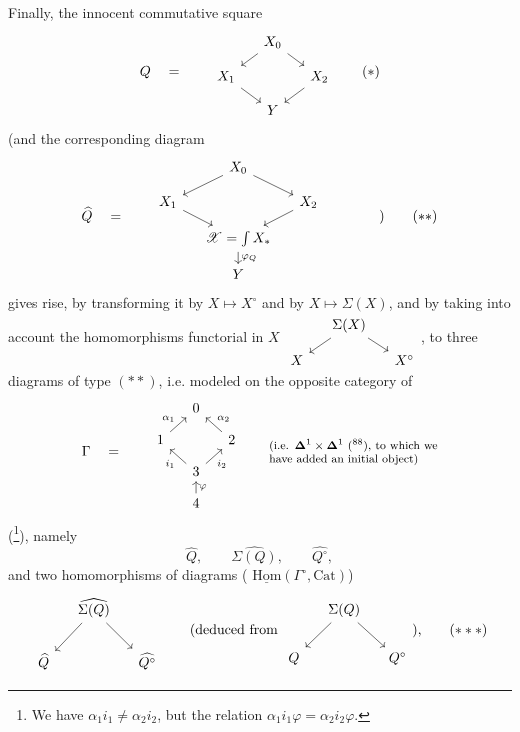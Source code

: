 \documentclass[11pt]{article}
\newcommand{\printedpage}[1]{\marginpar{\footnotesize p.~#1}}
\newcommand{\msp}[1]{\marginpar{\footnotesize [#1]}}
\newcommand{\Cat}{\mathrm{Cat}}
\newcommand{\Hom}{\mathrm{Hom}}
\newcommand{\sX}{\mathscr{X}}
\begin{document}
Finally, the innocent commutative square
\[
Q \quad = \qquad
\begin{tikzcd}[row sep=small, column sep=small]
 & X_0 \arrow[dl] \arrow[dr] & \\
X_1 \arrow[dr] & & X_2 \arrow[dl] \\
 & Y &
\end{tikzcd}
\tag*{$(*)$}
\]
(and the corresponding diagram
\[
\widehat{Q} \quad = \qquad
\begin{tikzcd}[row sep=small, column sep=small]
 & X_0 \arrow[dl] \arrow[dr] & \\
X_1 \arrow[dr] & & X_2 \arrow[dl] \\
 & \sX=\int X_* \arrow[d, "\varphi_Q"] & \\
 & Y &
\end{tikzcd}
\qquad\qquad )
\tag*{$(**)$}
\]
gives rise, by transforming it
\msp{page 139}
by $X\longmapsto X^\circ$ and by $X\longmapsto\Sigma(X)$, and by taking into account the homomorphisms functorial in $X$ $\begin{tikzcd}[row sep=small, column sep=small]
 & \Sigma(X) \arrow[dl] \arrow[dr] & \\
X & & X^\circ
\end{tikzcd}$, to three diagrams of type $(**)$, i.e. modeled on the opposite category of
\[
\Gamma \quad = \qquad
\begin{tikzcd}[row sep=small, column sep=small]
 & 0 & \\
1 \arrow[ur, "\alpha_1"] & & 2 \arrow[ul, "\alpha_2"'] \\
 & 3 \arrow[ul, "i_1"] \arrow[ur, "i_2"'] & \\
 & 4 \arrow[u, "\varphi"'] &
\end{tikzcd}
\qquad
\text{\parbox[c]{0.35\textwidth}{\footnotesize (i.e. $\boldsymbol{\Delta}^1\times\boldsymbol{\Delta}^1$ (\footnotemark[88]), to which we have added an initial object)}} %
\]
\printedpage{95}
(\footnote[89]{We have $\alpha_1i_1\neq\alpha_2i_2$, but the relation $\alpha_1i_1\varphi=\alpha_2i_2\varphi$.}), namely
\[
\widehat{Q}, \qquad \widehat{\Sigma(Q)}, \qquad \widehat{Q^\circ},
\]
and two homomorphisms of diagrams ( $\underline{\Hom}(\Gamma^\circ,\Cat)$)
\[
\begin{tikzcd}[column sep=small]
 & \widehat{\Sigma(Q)} \arrow[dl] \arrow[dr] & \\
\widehat{Q} & & \widehat{Q^\circ}
\end{tikzcd}
\qquad
\text{(deduced from }
\begin{tikzcd}[column sep=small]
 & \Sigma(Q) \arrow[dl] \arrow[dr] & \\
Q & & Q^\circ
\end{tikzcd}
\text{),}
\tag*{$(***)$}
\]
\end{document}
